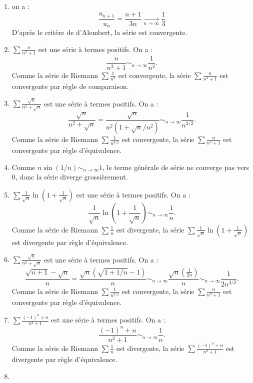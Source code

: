 \documentclass{book}
\begin{document}
\begin{Exercice}[Nature]
\begin{Correction}
    \begin{enumerate}
    \item on a : $$\frac{u_{n+1}}{u_n} =\frac{n+1}{3n}\xrightarrow[n\to\infty]{}\frac{1}{3}$$ D'après le critère de d'Alembert, la série est convergente.
        \item $\sum \frac{n}{n^3+1}$ est une série à termes positifs. On a :
$$\frac{n}{n^3+1}\sim_{n\to\infty}\frac{1}{n^2}.$$
Comme la série de Riemann $\sum \frac{1}{n^2}$ est convergente, la série $\sum \frac{n}{n^3+1}$ est convergente par règle de comparaison.
        \item $\sum \frac{\sqrt n}{n^2+\sqrt n}$ est une série à termes positifs. On a :
$$\frac{\sqrt n}{n^2+\sqrt n} =\frac{\sqrt n}{n^2(1 +\sqrt n /n^2)}  \sim_{n\to\infty}\frac{1}{n^{3/2}}.$$
Comme la série de Riemann $\sum \frac{1}{n^{3/2}}$ est convergente, la série $\sum \frac{n}{n^3+1}$ est convergente par règle d'équivalence.
\item Comme  $ n\sin(1/n)\sim_{n\to\infty} 1$, le terme générale de série ne converge pas vers 0, donc la série diverge grossièrement.
\item $\sum \frac{1}{\sqrt{n}}\ln\left(1+\frac{1}{\sqrt{n}}\right)$ est une série à termes positifs. On a :
$$\frac{1}{\sqrt{n}}\ln\left(1+\frac{1}{\sqrt{n}}\right)   \sim_{n\to\infty}\frac{1}{n}.$$ 
Comme la série de Riemann $\sum \frac{1}{n}$ est divergente, la série $\sum \frac{1}{\sqrt{n}}\ln\left(1+\frac{1}{\sqrt{n}}\right)$  est divergente par règle d'équivalence.
\item $\sum \frac{\sqrt n}{n^2+\sqrt n}$ est une série à termes positifs. On a :
$$\frac{\sqrt {n+1}-\sqrt{n}}{n} =\frac{\sqrt{n}(\sqrt {1+1/n}-1)}{n}  \sim_{n\to\infty}\frac{\sqrt{n}(\frac{1}{2n})}{n}\sim_{n\to\infty}\frac{1}{2n^{3/2}}   .$$
Comme la série de Riemann $\sum \frac{1}{n^{3/2}}$ est convergente, la série $\sum \frac{n}{n^3+1}$ est convergente par règle d'équivalence.
 \item $\sum \frac{(-1)^n +n}{n^2+1}$ est une série à termes positifs. On a :
$$\frac{(-1)^n +n}{n^2+1}   \sim_{n\to\infty}\frac{1}{n}.$$ 
Comme la série de Riemann $\sum \frac{1}{n}$ est divergente, la série $\sum \frac{(-1)^n +n}{n^2+1}$  est divergente par règle d'équivalence.
 \item  
 
 
 

\end{enumerate}
\end{Correction}
\end{Exercice}
\end{document}
